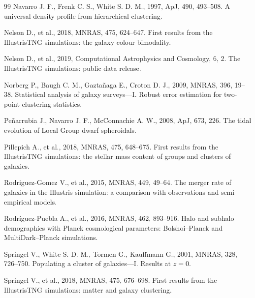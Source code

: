 \begin{thebibliography}{99}
Navarro J. F., Frenk C. S., White S. D. M., 1997, ApJ, 490, 493--508. A universal density profile from hierarchical clustering. 

Nelson D., et al., 2018, MNRAS, 475, 624--647. First results from the IllustrisTNG simulations: the galaxy colour bimodality. 

Nelson D., et al., 2019, Computational Astrophysics and Cosmology, 6, 2. The IllustrisTNG simulations: public data release. 

Norberg P., Baugh C. M., Gazta\~naga E., Croton D. J., 2009, MNRAS, 396, 19--38. Statistical analysis of galaxy surveys---I. Robust error estimation for two-point clustering statistics. 

Pe\~narrubia J., Navarro J. F., McConnachie A. W., 2008, ApJ, 673, 226. The tidal evolution of Local Group dwarf spheroidals. 

Pillepich A., et al., 2018, MNRAS, 475, 648--675. First results from the IllustrisTNG simulations: the stellar mass content of groups and clusters of galaxies. 

Rodriguez-Gomez V., et al., 2015, MNRAS, 449, 49--64. The merger rate of galaxies in the Illustris simulation: a comparison with observations and semi-empirical models. 

Rodr\'{i}guez-Puebla A., et al., 2016, MNRAS, 462, 893--916. Halo and subhalo demographics with Planck cosmological parameters: Bolshoi--Planck and MultiDark--Planck simulations. 

Springel V., White S. D. M., Tormen G., Kauffmann G., 2001, MNRAS, 328, 726--750. Populating a cluster of galaxies---I. Results at $z=0$. 

Springel V., et al., 2018, MNRAS, 475, 676--698. First results from the IllustrisTNG simulations: matter and galaxy clustering. 


\end{thebibliography}
